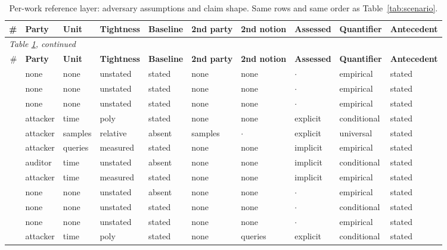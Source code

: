 \begin{landscape}
\begingroup\scriptsize\setlength{\tabcolsep}{4pt}
\begin{longtable}{rlllllllll}
\caption{Per-work reference layer: adversary assumptions and claim shape. Same rows and same order as Table~\ref{tab:scenario}.}\label{tab:adversary}\\
\toprule \# & \textbf{Party} & \textbf{Unit} & \textbf{Tightness} & \textbf{Baseline} & \textbf{2nd party} & \textbf{2nd notion} & \textbf{Assessed} & \textbf{Quantifier} & \textbf{Antecedent} \\ \midrule\endfirsthead
\multicolumn{10}{l}{\emph{Table \ref{tab:adversary}, continued}}\\
\toprule \# & \textbf{Party} & \textbf{Unit} & \textbf{Tightness} & \textbf{Baseline} & \textbf{2nd party} & \textbf{2nd notion} & \textbf{Assessed} & \textbf{Quantifier} & \textbf{Antecedent} \\ \midrule\endhead
\bottomrule\endfoot
\cite{DZT25} & none & none & unstated & stated & none & none & $\cdot$ & empirical & stated \\
\cite{RL21} & none & none & unstated & stated & none & none & $\cdot$ & empirical & stated \\
\cite{DSMMSZTCEH24} & none & none & unstated & stated & none & none & $\cdot$ & empirical & stated \\
\cite{VDKMR26} & attacker & time & poly & stated & none & none & explicit & conditional & stated \\
\cite{HSU25} & attacker & samples & relative & absent & samples & $\cdot$ & explicit & universal & stated \\
\cite{SSSS17} & attacker & queries & measured & stated & none & none & implicit & empirical & stated \\
\cite{ZDKT25} & auditor & time & unstated & absent & none & none & implicit & conditional & stated \\
\cite{CCNSTT22} & attacker & time & measured & stated & none & none & implicit & empirical & stated \\
\cite{AZT24} & none & none & unstated & absent & none & none & $\cdot$ & empirical & stated \\
\cite{YGFJ18} & none & none & unstated & stated & none & none & $\cdot$ & conditional & stated \\
\cite{MSJFRM25} & none & none & unstated & stated & none & none & $\cdot$ & empirical & stated \\
\cite{GIKKM23} & attacker & time & poly & stated & none & queries & explicit & conditional & stated \\

\end{longtable}
\end{landscape}
